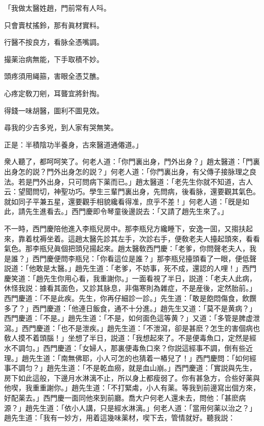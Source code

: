 「我做太醫姓趙，門前常有人呌。

只會賣杖搖鈴，那有眞材實料。　

行醫不按良方，看脉全憑嘴調。

撮薬治病無能，下手取積不妙。

頭疼須用䋲箍，害眼全憑艾醮。

心疼定敎刀剜，耳聾宜將針掏。

得錢一味胡醫，圖利不圖見效。

尋我的少吉多兇，到人家有哭無笑。

正是：半積陰功半養身，古來醫道通僊道。」

衆人聽了，都呵呵笑了。何老人道：「你門裏出身，門外出身？」趙太醫道：「門裏出身怎的説？門外出身怎的説？」何老人道：「你門裏出身，有父傳子接脉理之良法。若是門外出身，只可問病下薬而已。」趙太醫道：「老先生你就不知道，古人云：望聞問切，神聖功巧。學生三輩門裏出身，先問病，後看脉，還要觀其氣色。就如同子平兼五星，還要觀手相貌纔看得准，庶乎不差！」何老人道：「旣是如此，請先生進看去。」西門慶即令琴童後邊説去：「又請了趙先生來了。」

不一時，西門慶陪他進入李瓶兒房中。那李瓶兒方纔睡下，安逸一囬，又搊扶起來，靠着枕褥坐着。這趙太醫先診其左手，次診右手，便敎老夫人擡起頭來，看看氣色。那李瓶兒眞個把頭兒揚起來。趙太醫敎西門慶：「老爹，你問聲老夫人，我是誰？」西門慶便問李瓶兒：「你看這位是誰？」那李瓶兒擡頭看了一眼，便低聲説道：「他敢是太醫。」趙先生道：「老爹，不妨事，死不成，還認的人哩！」西門慶笑道：「趙先生你用心看，我重謝你。」一面看視了半日，説道：「老夫人此病，休怪我説：據看其面色，又診其脉息，非傷寒則為雜症，不是産後，定然胎前。」西門慶道：「不是此疾。先生，你再仔細診一診。」先生道：「敢是飽悶傷食，飲饌多了？」西門慶道：「他連日飯食，通不十分進。」趙先生又道：「莫不是黄病？」西門慶道：「不是。」趙先生道：「不是，如何面色這等黄？」又道：「多管是脾虚泄瀉。」西門慶道：「也不是泄疾。」趙先生道：「不泄瀉，卻是甚麽？怎生的害個病也敎人摸不着頭腦！」坐想了半日，説道：「我想起來了。不是便毒魚口，定然是經水不調匀。」西門慶道：「女婦人，那裏便毒魚口來？你説這經事不調，倒有些近理。」趙先生道：「南無佛耶，小人可怎的也猜着一樁兒了！」西門慶問：「如何經事不調匀？」趙先生道：「不是乾血癆，就是血山崩。」西門慶道：「實説與先生，房下如此這般，下邊月水淋漓不止，所以身上都瘦弱了。你有甚急方，合些好薬與他喫，我重重謝你。」趙先生道：「不打緊䖏，小人有薬。等我到前邊寫出個方來，好配薬去。」西門慶一面同他來到前廳。喬大户何老人還未去，問他：「甚麽病源？」趙先生道：「依小人講，只是經水淋漓。」何老人道：「當用何薬以治之？」趙先生道：「我有一妙方，用着這幾味薬材，喫下去，管情就好。聽我説：

